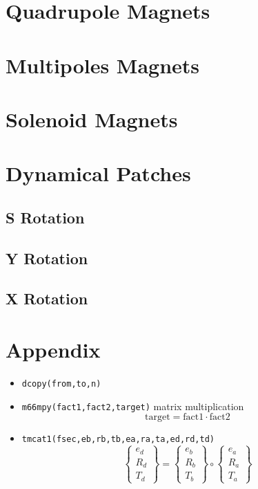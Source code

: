 \documentclass{cern-art} %
\renewcommand{\L}[1]{\lstinline[firstnumber=last]{#1}}
\begin{document}
\section{Quadrupole Magnets}

\section{Multipoles Magnets}

\section{Solenoid Magnets}

\section{Dynamical Patches}

\subsection{S Rotation}

\subsection{Y Rotation}

\subsection{X Rotation}

\appendix
\section{Appendix}
\begin{itemize}
\item[-] \L{dcopy(from,to,n)}
\item[-] \L{m66mpy(fact1,fact2,target)} matrix multiplication $$\text{target} = \text{fact1} \cdot \text{fact2}$$
\item[-] \L{tmcat1(fsec,eb,rb,tb,ea,ra,ta,ed,rd,td)}$$\left\{ \begin{array}{c}
e_{d}\\
R_{d}\\
T_{d}
\end{array}\right\} =\left\{ \begin{array}{c}
e_{b}\\
R_{b}\\
T_{b}
\end{array}\right\} \circ \left\{ \begin{array}{c}
e_{a}\\
R_{a}\\
T_{a}
\end{array}\right\} $$
\end{itemize}
\end{document}
